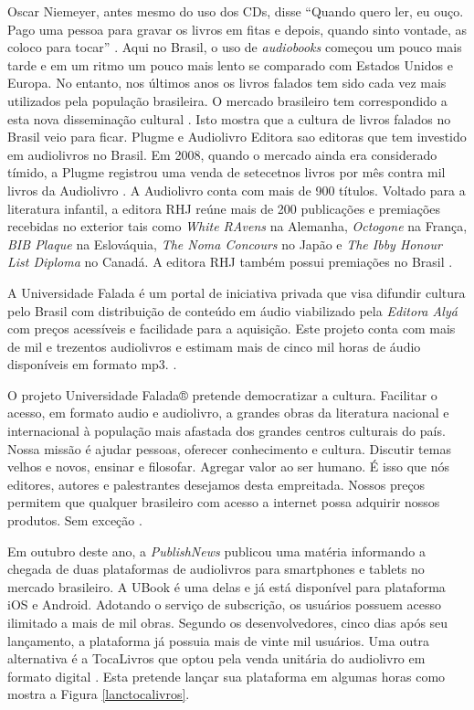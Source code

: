Oscar Niemeyer, antes mesmo do uso dos CDs, disse ``Quando quero ler, eu ouço. Pago uma pessoa para gravar os livros em fitas e depois, quando sinto vontade, as coloco para tocar'' \cite{audiobookinovacao}. Aqui no Brasil, o uso de \textit{audiobooks} começou um pouco mais tarde e em um ritmo um pouco mais lento se comparado com Estados Unidos e Europa. No entanto, nos últimos anos os livros falados tem sido cada vez mais utilizados pela população brasileira. O mercado brasileiro tem correspondido a esta nova disseminação cultural \cite{farias}. Isto mostra que a cultura de livros falados no Brasil veio para ficar. Plugme e Audiolivro Editora sao editoras que tem investido em audiolivros no Brasil. Em 2008, quando o mercado ainda era considerado tímido, a Plugme registrou uma venda de setecetnos livros por mês contra mil livros da Audiolivro \cite{audiobooksuporte}. A Audiolivro conta com mais de 900 títulos. Voltado para a literatura infantil, a editora RHJ reúne mais de 200 publicações e premiações recebidas no exterior tais como \textit{White RAvens} na Alemanha, \textit{Octogone} na França, \textit{BIB Plaque} na Eslováquia, \textit{The Noma Concours} no Japão e \textit{The Ibby Honour List Diploma} no Canadá. A editora RHJ também possui premiações no Brasil \cite{rhj}.

A Universidade Falada é um portal de iniciativa privada que visa difundir cultura pelo Brasil com distribuição de conteúdo em áudio viabilizado pela \textit{Editora Alyá} com preços acessíveis e facilidade para a aquisição. Este projeto conta com mais de mil e trezentos audiolivros e estimam mais de cinco mil horas de áudio disponíveis em formato mp3. \cite{universidadefalada}.

\begin{citacao}
O projeto Universidade Falada® pretende democratizar a cultura. Facilitar o acesso, em formato audio e audiolivro, a grandes obras da literatura nacional e internacional à população mais afastada dos grandes centros culturais do país. Nossa missão é ajudar pessoas, oferecer conhecimento e cultura. Discutir temas velhos e novos, ensinar e filosofar. Agregar valor ao ser humano. É isso que nós editores, autores e palestrantes desejamos desta empreitada. Nossos preços permitem que qualquer brasileiro com acesso a internet possa adquirir nossos produtos. Sem exceção \cite{universidadefalada}.
\end{citacao}

Em outubro deste ano, a \textit{PublishNews} publicou uma matéria informando a chegada de duas plataformas de audiolivros para smartphones e tablets no mercado brasileiro. A UBook é uma delas e já está disponível para plataforma iOS e Android. Adotando o serviço de subscrição, os usuários possuem acesso ilimitado a mais de mil obras. Segundo os desenvolvedores, cinco dias após seu lançamento, a plataforma já possuia mais de vinte mil usuários. Uma outra alternativa é a TocaLivros que optou pela venda unitária do audiolivro em formato digital \cite{publishnews}. Esta pretende lançar sua plataforma em algumas horas como mostra a Figura \ref{lanctocalivros}.

